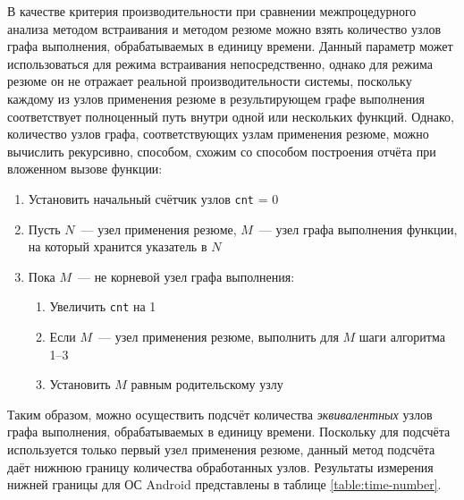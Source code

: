 В качестве критерия производительности при сравнении межпроцедурного анализа методом встраивания и методом резюме можно взять количество узлов графа выполнения, обрабатываемых в единицу времени. Данный параметр может использоваться для режима встраивания непосредственно, однако для режима резюме он не отражает реальной производительности системы, поскольку каждому из узлов применения резюме в результирующем графе выполнения соответствует полноценный путь внутри одной или нескольких функций. Однако, количество узлов графа, соответствующих узлам применения резюме, можно вычислить рекурсивно, способом, схожим со способом построения отчёта при вложенном вызове функции: 

\begin{enumerate}
 \item Установить начальный счётчик узлов \texttt{cnt} = 0
 \item Пусть $N$~--- узел применения резюме, $M$~--- узел графа выполнения функции, на который хранится указатель в $N$
 \item Пока $M$~--- не корневой узел графа выполнения:
  \begin{enumerate}
   \item Увеличить \texttt{cnt} на 1
   \item Если $M$~--- узел применения резюме, выполнить для $M$ шаги алгоритма 1--3
   \item Установить $M$ равным родительскому узлу
  \end{enumerate}
\end{enumerate}

Таким образом, можно осуществить подсчёт количества \textit{эквивалентных} узлов графа выполнения, обрабатываемых в единицу времени. Поскольку для подсчёта используется только первый узел применения резюме, данный метод подсчёта даёт нижнюю границу количества обработанных узлов. Результаты измерения нижней границы для ОС Android представлены в таблице \ref{table:time-number}.

